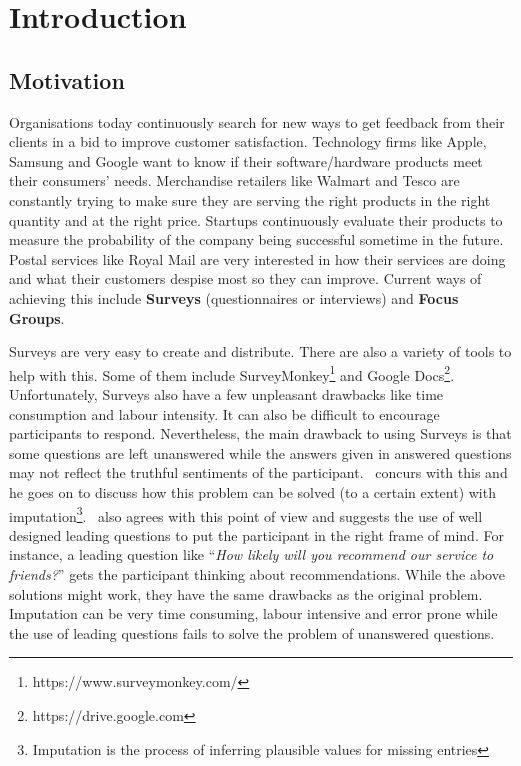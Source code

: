 
\chapter{Introduction}
\label{cha:introduction}

\section{Motivation}
\label{sec:motivation}
Organisations today continuously search for new ways to get feedback from their clients in a bid to
improve customer satisfaction. Technology firms like Apple, Samsung and Google want to know if their
software/hardware products meet their consumers' needs. Merchandise retailers like Walmart and Tesco
are constantly trying to make sure they are serving the right products in the right quantity and at
the right price. Startups continuously evaluate their products to measure the probability of the
company being successful sometime in the future. Postal services like Royal Mail are very interested
in how their services are doing and what their customers despise most so they can improve. Current
ways of achieving this include \textbf{Surveys} (questionnaires or interviews) and \textbf{Focus
Groups}.

Surveys are very easy to create and distribute. There are also a variety of tools to help with this.
Some of them include SurveyMonkey\footnote{https://www.surveymonkey.com/} and Google
Docs\footnote{https://drive.google.com}. Unfortunately, Surveys also have a few unpleasant drawbacks
like time consumption and labour intensity. It can also be difficult to encourage participants to
respond. Nevertheless, the main drawback to using Surveys is that some questions are left unanswered
while the answers given in answered questions may not reflect the truthful sentiments of the
participant.~\citet{rubin1987} concurs with this and he goes on to discuss how this problem can be
solved (to a certain extent) with imputation\footnote{Imputation is the process of inferring
plausible values for missing entries}.~\citet{hayes2008} also agrees with this point of view and
suggests the use of well designed leading questions to put the participant in the right frame of
mind. For instance, a leading question like ``\textit{How likely will you recommend our service to
friends?}'' gets the participant thinking about recommendations. While the above solutions might
work, they have the same drawbacks as the original problem. Imputation can be very time
consuming, labour intensive and error prone while the use of leading questions fails to solve the
problem of unanswered questions.

